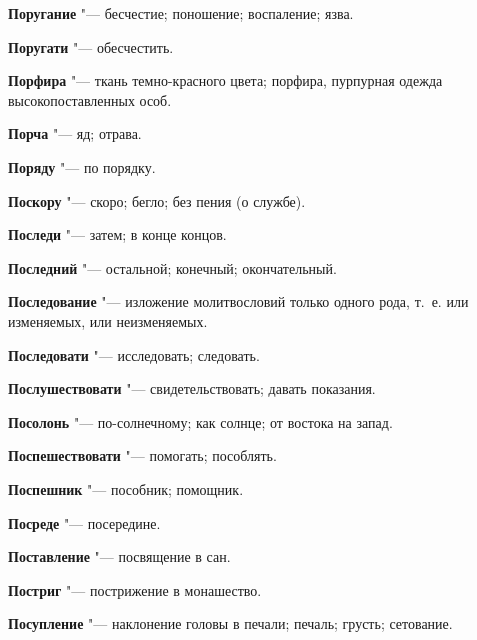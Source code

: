\begin{mymulticols}{2}
\noindent\textbf{Поругание} "--- бесчестие; поношение; воспаление; язва. 




\noindent\textbf{Поругати} "--- обесчестить. 




\noindent\textbf{Порфира} "--- ткань темно-красного цвета; порфира, пурпурная одежда высокопоставленных особ. 




\noindent\textbf{Порча} "--- яд; отрава. 




\noindent\textbf{Поряду} "--- по порядку. 




\noindent\textbf{Поскору} "--- скоро; бегло; без пения (о службе). 




\noindent\textbf{Последи} "--- затем; в конце концов. 




\noindent\textbf{Последний} "--- остальной; конечный; окончательный. 




\noindent\textbf{Последование} "--- изложение молитвословий только одного рода, т.~е. или изменяемых, или неизменяемых. 




\noindent\textbf{Последовати} "--- исследовать; следовать. 




\noindent\textbf{Послушествовати} "--- свидетельствовать; давать показания. 




\noindent\textbf{Посолонь} "--- по-солнечному; как солнце; от востока на запад. 




\noindent\textbf{Поспешествовати} "--- помогать; пособлять. 




\noindent\textbf{Поспешник} "--- пособник; помощник. 




\noindent\textbf{Посреде} "--- посередине. 




\noindent\textbf{Поставление} "--- посвящение в сан. 




\noindent\textbf{Постриг} "--- пострижение в монашество. 




\noindent\textbf{Посупление} "--- наклонение головы в печали; печаль; грусть; сетование. 





\end{mymulticols}
